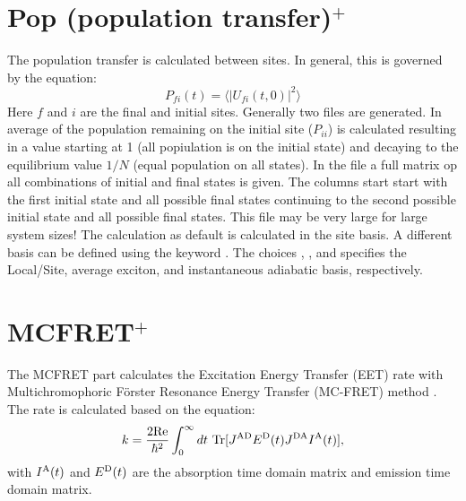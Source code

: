 \section{Pop (population transfer)$^{+}$}
The population transfer is calculated between sites.
In general, this is governed by the equation:
\begin{equation}
P_{fi}(t)=\langle |U_{fi}(t,0)|^2 \rangle
\end{equation}
Here $f$ and $i$ are the final and initial sites.
Generally two files are generated.
In  average of the population remaining on the initial site ($P_{ii}$)
is calculated resulting in a value starting at 1 (all popiulation is on the initial
state) and decaying to the equilibrium value $1/N$ (equal population on all states).
In the  file a full matrix op all combinations of initial and final
states is given. The columns start start with the first initial state and all possible
final states continuing to the second possible initial state and all possible final
states. This file may be very large for large system sizes!
The calculation as default is calculated in the site basis.
A different basis can be defined using the keyword .
The choices , , and  specifies the Local/Site,
average exciton, and instantaneous adiabatic basis, respectively.

\section{MCFRET$^{+}$}
The MCFRET part calculates the Excitation Energy Transfer (EET) rate with
Multichromophoric Förster Resonance Energy Transfer (MC-FRET) method
\cite{Jang.2004.Phys.Rev.Lett..92.218301,Jang.2007.J.Phys.Chem.B..111.6807,Zhong.2023.J.Chem.Phys..158.064103}.
The rate is calculated based on the equation:
\begin{equation}\label{eq:17} 
    k=\frac{\rm 2Re}{\hbar^2}\int_{0}^{\infty}dt\ \textrm{Tr}[J^{\textrm {AD}}E^{\textrm D}(t)J^{\textrm {DA}}I^{\textrm A}(t)],
\end{equation}
with $I^{\textrm A}(t)$ and $E^{\textrm D}(t)$ are the absorption time domain matrix
and emission time domain matrix. 

